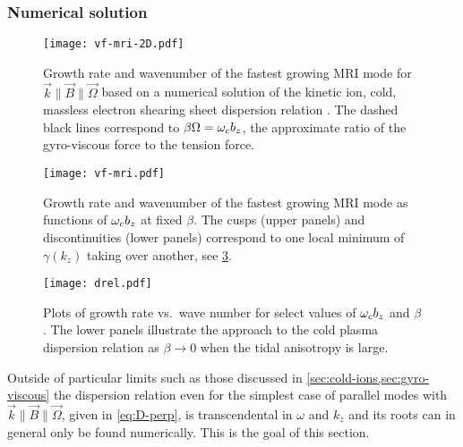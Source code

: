 \documentclass[aps,pre,notitlepage,amsmath,amssymb,amsfonts,nobibnotes,nofootinbib]{revtex4-1}
\begin{document}
\subsubsection{Numerical solution}

\begin{figure}
  \centering\texttt{[image: vf-mri-2D.pdf]}
  \caption{Growth rate and wavenumber of the fastest growing MRI mode for
    $\vec{k}\bm{\parallel}\vec{B}\bm{\parallel}\vec{\Omega}$ based on a
    numerical solution of the kinetic ion, cold, massless electron shearing
    sheet dispersion relation . The dashed black lines
    correspond to $\beta\Omega=\omega_c{}b_z$, the approximate ratio of the
    gyro-viscous force to the tension force.}\label{fig:vf-mri-2D}
\end{figure}

\begin{figure}
  \centering\texttt{[image: vf-mri.pdf]}
  \caption{Growth rate and wavenumber of the fastest growing MRI mode as
    functions of $\omega_c{}b_z$ at fixed $\beta$. The cusps (upper panels) and
    discontinuities (lower panels) correspond to one local minimum of
    $\gamma(k_z)$ taking over another, see \cref{fig:drel}.}\label{fig:vf-mri}
\end{figure}

\begin{figure}
  \centering\texttt{[image: drel.pdf]}
  \caption{Plots of
    growth rate vs.\ wave number for select values of $\omega_c{}b_z$ and $\beta$.
    The lower panels illustrate the approach to the cold plasma dispersion
    relation as $\beta\to0$ when the tidal anisotropy is
    large.}\label{fig:drel}
\end{figure}

Outside of particular limits such as those discussed in
\cref{sec:cold-ions,sec:gyro-viscous} the dispersion relation even for the
simplest case of parallel modes with
$\vec{k}\bm{\parallel}\vec{B}\bm{\parallel}\vec{\Omega}$, given in
\cref{eq:D-perp}, is transcendental in $\omega$ and $k_z$ and its roots can in
general only be found numerically. This is the goal of this section.
\end{document}
